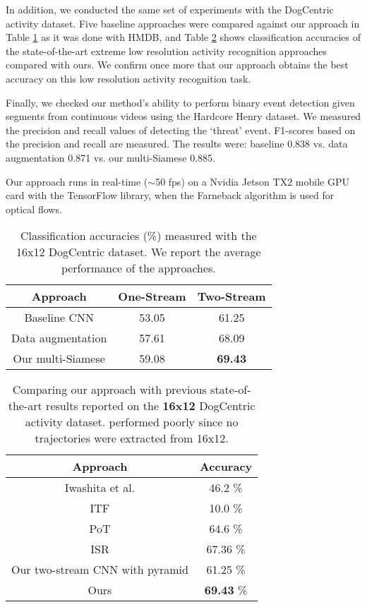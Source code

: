 \documentclass[letterpaper]{article} %
\begin{document}
In addition, we conducted the same set of experiments with the DogCentric activity dataset. Five baseline approaches were compared against our approach in Table \ref{table:dog} as it was done with HMDB, and Table \ref{table:dog-comp} shows classification accuracies of the state-of-the-art extreme low resolution activity recognition approaches compared with ours. We confirm once more that our approach obtains the best accuracy on this low resolution activity recognition task. 

Finally, we checked our method's ability to perform binary event detection given segments from continuous videos using the Hardcore Henry dataset. We measured the precision and recall values of detecting the `threat' event. F1-scores based on the precision and recall are measured. The results were: baseline 0.838 vs. data augmentation 0.871 vs. our multi-Siamese 0.885.


Our approach runs in real-time ($\sim$50 fps) on a Nvidia Jetson TX2 mobile GPU card with the TensorFlow library, when the Farneback algorithm is used for optical flows.



\begin{table}
	\caption{Classification accuracies (\%) measured with the 16x12 DogCentric dataset. We report the average performance of the approaches.}
	\label{table:dog}

	\center
	\setlength\extrarowheight{0.5pt}

		\begin{tabular}{c|c|c}
			\hline 	Approach & One-Stream & Two-Stream \tabularnewline
			\hline 	Baseline CNN &  53.05	& 	61.25   \tabularnewline
			        Data augmentation & 57.61		& 68.09  \tabularnewline
			        Our multi-Siamese & 59.08	& 	\textbf{69.43}	  \tabularnewline
			\hline
		\end{tabular}
\end{table}

\begin{table}
	\caption{Comparing our approach with previous state-of-the-art results reported on the \textbf{16x12} DogCentric activity dataset. \cite{wang13} performed poorly since no trajectories were extracted from 16x12.}
	\label{table:dog-comp}

	\center
	\setlength\extrarowheight{0.5pt}

		\begin{tabular}{c|c}
			\hline 	Approach & Accuracy \tabularnewline
			\hline 	
			        Iwashita et al.  \cite{dogcentric} & 46.2 \%	 \tabularnewline
			        ITF \cite{wang13} & 10.0 \% \tabularnewline
			        PoT \cite{ryoo15} & 64.6 \% \tabularnewline
			        ISR \cite{ryoo17privacy} & 67.36 \%	 \tabularnewline
			\hline
			        Our two-stream CNN with pyramid  & 61.25	\%  \tabularnewline
			        Ours    & \textbf{69.43} \%	  \tabularnewline
			\hline
		\end{tabular}

\end{table}
\end{document}
